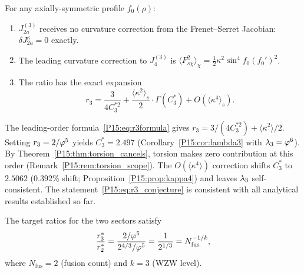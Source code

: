 \begin{proposition}
\label{P15:prop:r3_exact}
For any axially-symmetric profile $f_0(\rho)$:
\begin{enumerate}[label=\textup{(\roman*)}]
\item $J_{2a}^{(3)}$ receives no curvature correction from the
  Frenet--Serret Jacobian: $\delta J_{2a}^\kappa = 0$ exactly.
\item The leading curvature correction to $J_4^{(3)}$ is
  $\langle F_{s\chi}^2\rangle_\chi = \tfrac12\kappa^2\sin^4\!f_0(f_0')^2$.
\item The ratio has the exact expansion
  \begin{equation}
    r_3 = \frac{3}{4C_3^{*2}}
    + \frac{\langle\kappa^2\rangle_s}{2}\cdot\Gamma(C_3^*)
    + O(\langle\kappa^4\rangle_s).
    \label{P15:eq:r3_exact_expansion}
  \end{equation}
\end{enumerate}
\end{proposition}

\begin{remark}
\label{P15:rem:thin_tube_relation}
The leading-order formula~\eqref{P15:eq:r3formula} gives
$r_3 = 3/(4C_3^{*2})+\langle\kappa^2\rangle/2$.
Setting $r_3=2/\varphi^5$ yields $C_3^*=2.497$
(Corollary~\ref{P15:cor:lambda3} with $\lambda_3=\varphi^6$).
By Theorem~\ref{P15:thm:torsion_cancels}, torsion makes zero
contribution at this order (Remark~\ref{P15:rem:torsion_scope}).
The $O(\langle\kappa^4\rangle)$ correction shifts $C_3^*$ to
$2.5062$ ($0.392\%$ shift; Proposition~\ref{P15:prop:kappa4}) and
leaves $\lambda_3$ self-consistent.
The statement~\eqref{P15:eq:r3_conjecture} is consistent with all
analytical results established so far.
\end{remark}

\begin{lemma}
\label{P15:lem:fusion_ratio}
The target ratios for the two sectors satisfy
\begin{equation}
  \frac{r_3^*}{r_2^*}
  = \frac{2/\varphi^5}{2^{4/3}/\varphi^5}
  = \frac{1}{2^{1/3}}
  = N_{\mathrm{fus}}^{-1/k},
  \label{P15:eq:fusion_ratio}
\end{equation}
where $N_{\mathrm{fus}}=2$ (fusion count) and $k=3$ (WZW level).
\end{lemma}

